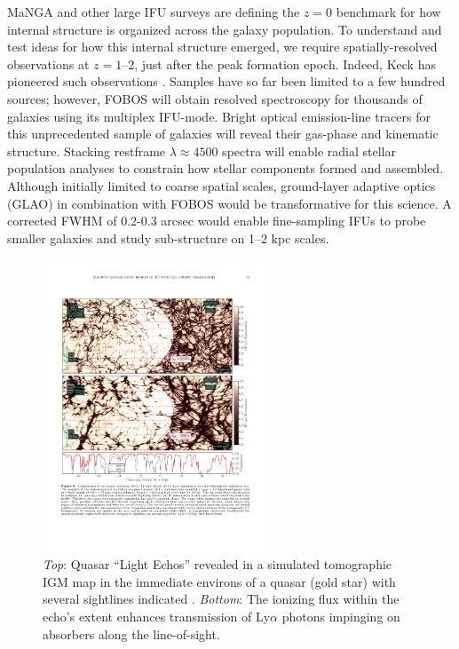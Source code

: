 MaNGA \citep{bundy15} and other large IFU surveys are defining the
$z=0$ benchmark for how internal structure is organized across the
galaxy population. To understand and test ideas for how this internal
structure emerged, we require spatially-resolved observations at $z =
1$--2, just after the peak formation epoch. Indeed, Keck has
pioneered such observations \citep[e.g.,][]{erb04, miller11,law09}.
Samples have so far been limited to a few hundred sources; however,
FOBOS will obtain resolved spectroscopy for thousands of galaxies
using its multiplex IFU-mode. Bright optical emission-line tracers
for this unprecedented sample of galaxies will reveal their gas-phase
and kinematic structure. Stacking restframe $\lambda \approx 4500$
spectra will enable radial stellar population analyses to constrain
how stellar components formed and assembled. Although initially
limited to coarse spatial scales, ground-layer adaptive optics (GLAO)
in combination with FOBOS would be transformative for this science. A
corrected FWHM of 0.2-0.3 arcsec would enable fine-sampling IFUs to
probe smaller galaxies and study sub-structure on 1--2 kpc scales.

\begin{figure}
%
\includegraphics[width=0.6\textwidth]{figs/qso_LightEcho_v1.pdf}
%
\caption{{\it Top}: Quasar ``Light Echos'' revealed in a simulated
tomographic IGM map in the immediate environs of a quasar (gold star)
with several sightlines indicated
\citep[from][]{2018arXiv181005156S}. {\it Bottom}: The ionizing flux
within the echo's extent enhances transmission of Ly$\alpha$ photons
impinging on absorbers along the line-of-sight.}
\label{fig:LightEcho}
\end{figure}

